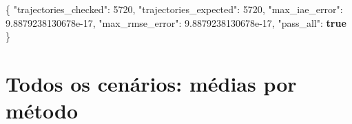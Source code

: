 \documentclass[
  11pt,
]{article}
\newenvironment{Shaded}{}{}
\newcommand{\DataTypeTok}[1]{\textcolor[rgb]{0.56,0.13,0.00}{#1}}
\newcommand{\DecValTok}[1]{\textcolor[rgb]{0.25,0.63,0.44}{#1}}
\newcommand{\FloatTok}[1]{\textcolor[rgb]{0.25,0.63,0.44}{#1}}
\newcommand{\FunctionTok}[1]{\textcolor[rgb]{0.02,0.16,0.49}{#1}}
\newcommand{\KeywordTok}[1]{\textcolor[rgb]{0.00,0.44,0.13}{\textbf{#1}}}
\begin{document}
\begin{Shaded}
\begin{Highlighting}[]
\FunctionTok{\{}
  \DataTypeTok{"trajectories\_checked"}\FunctionTok{:} \DecValTok{5720}\FunctionTok{,}
  \DataTypeTok{"trajectories\_expected"}\FunctionTok{:} \DecValTok{5720}\FunctionTok{,}
  \DataTypeTok{"max\_iae\_error"}\FunctionTok{:} \FloatTok{9.8879238130678e{-}17}\FunctionTok{,}
  \DataTypeTok{"max\_rmse\_error"}\FunctionTok{:} \FloatTok{9.8879238130678e{-}17}\FunctionTok{,}
  \DataTypeTok{"pass\_all"}\FunctionTok{:} \KeywordTok{true}
\FunctionTok{\}}
\end{Highlighting}
\end{Shaded}

\hypertarget{todos-os-cenuxe1rios-muxe9dias-por-muxe9todo}{%
\section{Todos os cenários: médias por
método}\label{todos-os-cenuxe1rios-muxe9dias-por-muxe9todo}}

\begingroup\footnotesize
\end{document}
